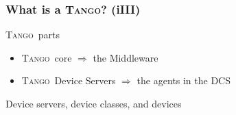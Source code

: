 \documentclass{beamer}
\newcommand{\tango}{\textsc{Tango}}
\begin{document}
\begin{frame}
\frametitle{What is a \tango? (iIII)}
    \begin{block}{\tango\, parts}
        \begin{itemize}
            \item \tango\, core $\Rightarrow$ the Middleware
            \item \tango\, Device Servers $\Rightarrow$ the agents in the DCS
        \end{itemize}
    \end{block}
    \begin{exampleblock}{Device servers, device classes, and devices}
        \begin{figure}[h]
        \end{figure}
    \end{exampleblock}
\end{frame}
\end{document}
